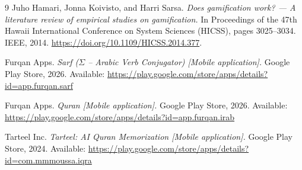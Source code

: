 \documentclass[A4paper,12pt]{article}
\begin{document}
\begin{thebibliography}{9}
Juho Hamari, Jonna Koivisto, and Harri Sarsa.
\textit{Does gamification work? --- A literature review of empirical studies
on gamification.}
In Proceedings of the 47th Hawaii International Conference on System Sciences
(HICSS), pages 3025--3034. IEEE, 2014.
\url{https://doi.org/10.1109/HICSS.2014.377}.

Furqan Apps.
\textit{Sarf ({$\Sigma$\!\!\!\raisebox{-0.2ex}{$\varsigma$}} -- Arabic Verb Conjugator) [Mobile application].}
Google Play Store, 2026.
Available: \url{https://play.google.com/store/apps/details?id=app.furqan.sarf}

Furqan Apps.
\textit{Quran [Mobile application].}
Google Play Store, 2026.
Available: \url{https://play.google.com/store/apps/details?id=app.furqan.irab}

Tarteel Inc.
\textit{Tarteel: AI Quran Memorization [Mobile application].}
Google Play Store, 2024.
Available: \url{https://play.google.com/store/apps/details?id=com.mmmoussa.iqra}

\end{thebibliography}
\end{document}

